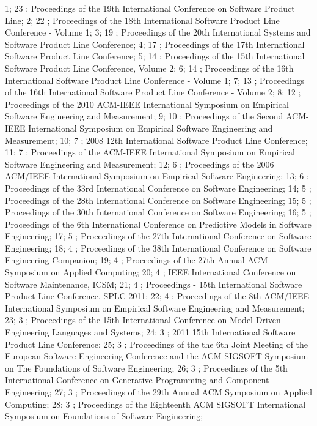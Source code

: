 1; 23 ; Proceedings of the 19th International Conference on Software Product Line; 
2; 22 ; Proceedings of the 18th International Software Product Line Conference - Volume 1; 
3; 19 ; Proceedings of the 20th International Systems and Software Product Line Conference; 
4; 17 ; Proceedings of the 17th International Software Product Line Conference; 
5; 14 ; Proceedings of the 15th International Software Product Line Conference, Volume 2; 
6; 14 ; Proceedings of the 16th International Software Product Line Conference - Volume 1; 
7; 13 ; Proceedings of the 16th International Software Product Line Conference - Volume 2; 
8; 12 ; Proceedings of the 2010 ACM-IEEE International Symposium on Empirical Software Engineering and Measurement; 
9; 10 ; Proceedings of the Second ACM-IEEE International Symposium on Empirical Software Engineering and Measurement; 
10; 7 ; 2008 12th International Software Product Line Conference; 
11; 7 ; Proceedings of the ACM-IEEE International Symposium on Empirical Software Engineering and Measurement; 
12; 6 ; Proceedings of the 2006 ACM/IEEE International Symposium on Empirical Software Engineering; 
13; 6 ; Proceedings of the 33rd International Conference on Software Engineering; 
14; 5 ; Proceedings of the 28th International Conference on Software Engineering; 
15; 5 ; Proceedings of the 30th International Conference on Software Engineering; 
16; 5 ; Proceedings of the 6th International Conference on Predictive Models in Software Engineering; 
17; 5 ; Proceedings of the 27th International Conference on Software Engineering; 
18; 4 ; Proceedings of the 38th International Conference on Software Engineering Companion; 
19; 4 ; Proceedings of the 27th Annual ACM Symposium on Applied Computing; 
20; 4 ; IEEE International Conference on Software Maintenance, ICSM; 
21; 4 ; Proceedings - 15th International Software Product Line Conference, SPLC 2011; 
22; 4 ; Proceedings of the 8th ACM/IEEE International Symposium on Empirical Software Engineering and Measurement; 
23; 3 ; Proceedings of the 15th International Conference on Model Driven Engineering Languages and Systems; 
24; 3 ; 2011 15th International Software Product Line Conference; 
25; 3 ; Proceedings of the the 6th Joint Meeting of the European Software Engineering Conference and the ACM SIGSOFT Symposium on The Foundations of Software Engineering; 
26; 3 ; Proceedings of the 5th International Conference on Generative Programming and Component Engineering; 
27; 3 ; Proceedings of the 29th Annual ACM Symposium on Applied Computing; 
28; 3 ; Proceedings of the Eighteenth ACM SIGSOFT International Symposium on Foundations of Software Engineering; 
